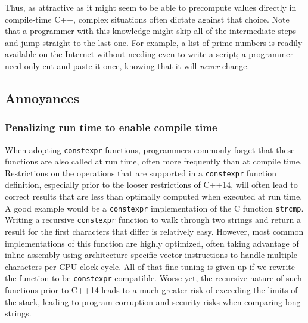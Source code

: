 \begin{enumerate}
\end{enumerate}

Thus, as attractive as it might seem to be able to precompute values
directly in compile-time C++, complex situations often dictate against
that choice. Note that a programmer with this knowledge might skip all
of the intermediate steps and jump straight to the last one. For
example, a list of prime numbers is readily available on the Internet
without needing even to write a script; a programmer need only cut and
paste it once, knowing that it will \emph{never} change.

\subsection[Annoyances]{Annoyances}\label{annoyances}

\subsubsection[Penalizing run time to enable compile time]{Penalizing run time to enable compile time}\label{penalizing-run-time-to-enable-compile-time}

When adopting \lstinline!constexpr! functions, programmers commonly forget
that these functions are also called at run time, often more frequently
than at compile time. Restrictions on the operations that are supported
in a \lstinline!constexpr! function definition, especially prior to the
looser restrictions of C++14, will often lead to correct results that
are less than optimally computed when executed at run time. A good
example would be a \lstinline!constexpr! implementation of the C function
\lstinline!strcmp!. Writing a recursive \lstinline!constexpr! function to walk
through two strings and return a result for the first characters that
differ is relatively easy. However, most common implementations of this
function are highly optimized, often taking advantage of inline assembly
using architecture-specific vector instructions to handle multiple
characters per CPU clock cycle. All of that fine tuning is given up if
we rewrite the function to be \lstinline!constexpr! compatible. Worse yet,
the recursive nature of such functions prior to C++14 leads to a much
greater risk of exceeding the limits of the stack, leading to program
corruption and security risks when comparing long strings.

